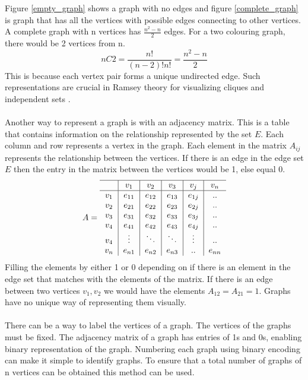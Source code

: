 \documentclass{Assignment}
\begin{document}
Figure \ref{empty_graph} shows a graph with no edges and figure \ref{complete_graph} is graph that has all the vertices with possible edges connecting to other vertices.
A complete graph with n vertices has ${\frac{n^2-n}{2}}$ edges.
For a two colouring graph, there would be 2 vertices from n. 
$$n C 2 =\frac{n!}{(n-2)!n!}= {\frac{n^2-n}{2}}$$
This is because each vertex pair forms a unique undirected edge.
Such representations are crucial in Ramsey theory for visualizing cliques and independent sets \cite{BondyMurty2008}.
\\\\
Another way to represent a graph is with an adjacency matrix.
This is a table that contains information on the relationship represented by the set $ E$.
Each column and row represents a vertex in the graph.
Each element in the matrix $A_{ij}$ represents the relationship between the vertices.
If there is an edge in the edge set $E$ then the entry in the matrix between the vertices would be 1, else equal 0.
\begin{equation}
	A=	\begin{tabular}{c|c|c|c|c|c}\hline
		&$v_1$&$v_2$&$v_3$&$v_j$&$v_n$\\\hline
		$v_1$&$e_{11}$&$e_{12}$&$e_{13}$&$e_{1j}$&..\\
		$v_2$&$e_{21}$&$e_{22}$&$e_{23}$&$e_{2j}$&..\\
		$v_3$&$e_{31}$&$e_{32}$&$e_{33}$&$e_{3j}$&..\\
		$v_4$&$e_{41}$&$e_{42}$&$e_{43}$&$e_{4j}$&..\\
		$v_4$&$\vdots$&$\ddots$&$\ddots$&$\vdots$&..\\
		$v_n$&$e_{n1}$&$e_{n2}$&$e_{n3}$&..&$e_{nn}$\\
	\end{tabular}
\end{equation}
Filling the elements by either 1 or 0 depending on if there is an element in the edge set that matches with the elements of the matrix.
If there is an edge between two vertices $v_1 ,v_2$ we would have the elements $A_{12} = A_{21}=1$. 
Graphs have no unique way of representing them visually.
\\\\
There can be a way to label the vertices of a graph.
The vertices of the graphs must be fixed.
The adjacency matrix of a graph has entries of 1s and 0s, enabling binary representation of the graph.
Numbering each graph using binary encoding can make it simple to identify graphs.
To ensure that a total number of graphs of n vertices can be obtained this method can be used.
\end{document}
